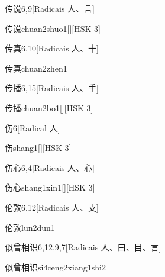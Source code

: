 \begin{entry}{传说}{6,9}[Radicais ⼈、⾔]
  \begin{phonetics}{传说}{chuan2shuo1}[][HSK 3]
  \end{phonetics}
\end{entry}

\begin{entry}{传真}{6,10}[Radicais ⼈、⼗]
  \begin{phonetics}{传真}{chuan2zhen1}
  \end{phonetics}
\end{entry}

\begin{entry}{传播}{6,15}[Radicais ⼈、⼿]
  \begin{phonetics}{传播}{chuan2bo1}[][HSK 3]
  \end{phonetics}
\end{entry}

\begin{entry}{伤}{6}[Radical ⼈]
  \begin{phonetics}{伤}{shang1}[][HSK 3]
  \end{phonetics}
\end{entry}

\begin{entry}{伤心}{6,4}[Radicais ⼈、⼼]
  \begin{phonetics}{伤心}{shang1xin1}[][HSK 3]
  \end{phonetics}
\end{entry}

\begin{entry}{伦敦}{6,12}[Radicais ⼈、⽁]
  \begin{phonetics}{伦敦}{lun2dun1}
  \end{phonetics}
\end{entry}

\begin{entry}{似曾相识}{6,12,9,7}[Radicais ⼈、⽈、⽬、⾔]
  \begin{phonetics}{似曾相识}{si4ceng2xiang1shi2}
  \end{phonetics}
\end{entry}

